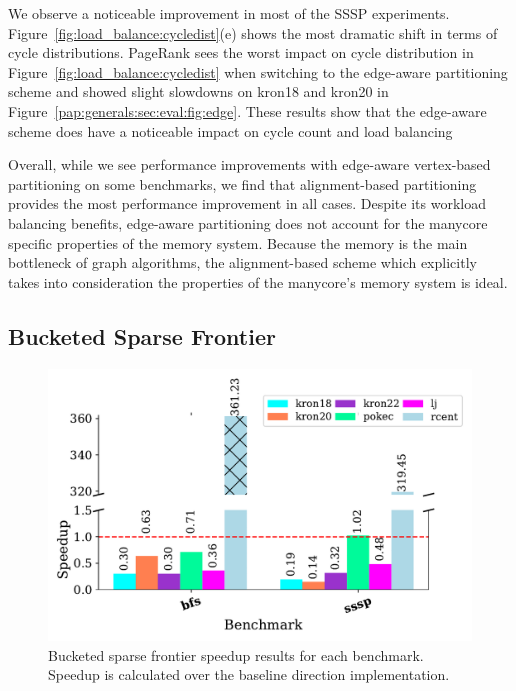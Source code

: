 We observe a noticeable improvement in most of the SSSP experiments.
Figure~\ref{fig:load_balance:cycledist}(e) shows the most dramatic shift in terms of cycle distributions. %
PageRank sees the worst impact on cycle distribution in Figure~\ref{fig:load_balance:cycledist} when switching to the edge-aware partitioning scheme and showed slight slowdowns on kron18 and kron20 in Figure~\ref{pap:generals:sec:eval:fig:edge}.
These results show that the edge-aware scheme does have a noticeable impact on cycle count and load balancing
 
Overall, while we see performance improvements with edge-aware vertex-based partitioning on some benchmarks, we find that alignment-based partitioning provides the most performance improvement in all cases. 
Despite its workload balancing benefits, edge-aware partitioning does not account for the manycore specific properties of the memory system.
Because the memory is the main bottleneck of graph algorithms, the alignment-based scheme which explicitly takes into consideration the properties of the manycore's memory system is ideal. 

\subsection{Bucketed Sparse Frontier}

\begin{figure}[h!]
    \centering
    \includegraphics[scale=0.6]{graphit-figures/sparse.pdf}
    \caption{Bucketed sparse frontier speedup results for each benchmark. Speedup is calculated over the baseline \push direction implementation.} %
    \label{pap:cgo2020:sec:eval:fig:sparse}
\end{figure}

